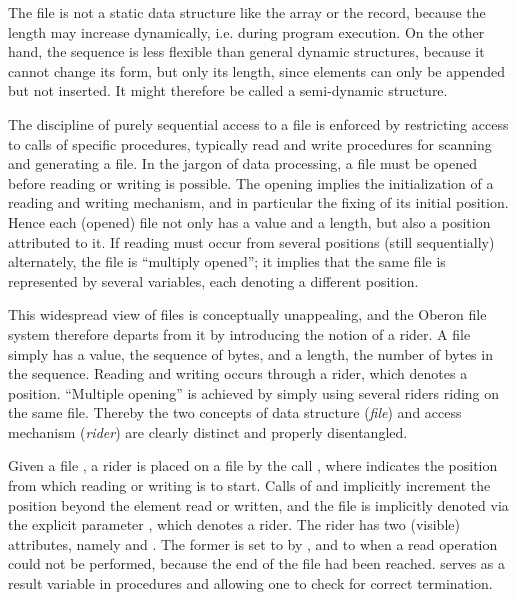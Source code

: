 The file is not a static data structure like the array or the record, because the length may increase dynamically, i.e. during program execution. On the other hand, the sequence is less flexible than general dynamic structures, because it cannot change its form, but only its length, since elements can only be appended but not inserted. It might therefore be called a semi-dynamic structure.

The discipline of purely sequential access to a file is enforced by restricting access to calls of specific procedures, typically read and write procedures for scanning and generating a file. In the jargon of data processing, a file must be opened before reading or writing is possible. The opening implies the initialization of a reading and writing mechanism, and in particular the fixing of its initial position. Hence each (opened) file not only has a value and a length, but also a position attributed to it. If reading must occur from several positions (still sequentially) alternately, the file is ``multiply opened''; it implies that the same file is represented by several variables, each denoting a different position.

This widespread view of files is conceptually unappealing, and the Oberon file system therefore departs from it by introducing the notion of a rider. A file simply has a value, the sequence of bytes, and a length, the number of bytes in the sequence. Reading and writing occurs through a rider, which denotes a position. ``Multiple opening'' is achieved by simply using several riders riding on the same file. Thereby the two concepts of data structure (\emph{file}) and access mechanism (\emph{rider}) are clearly distinct and properly disentangled.

Given a file , a rider  is placed on a file by the call
, where  indicates the position from which reading or writing is to start. Calls of  and  implicitly increment the position beyond the element read or written, and the file is implicitly denoted via the explicit parameter , which denotes a rider. The rider has two (visible) attributes, namely  and . The former is set to  by , and to  when a read operation could not be performed, because the end of the file had been reached.  serves as a result variable in procedures  and  allowing one to check for correct termination.

